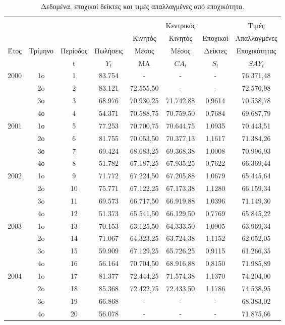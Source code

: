 \begin{table} [h]
  \caption{Δεδομένα, εποχικοί δείκτες και τιμές απαλλαγμένες από εποχικότητα.} 
  \label{tab_1}
  \begin{center}
    \begin{tabular}{|c|c|c|c|c|c|c|c|}
      \hline
           &         &              &          &         
           &         &              &          \\
           &         &              &          &
           & Κεντρικός  &     & Τιμές \\
           &  &  &  & Κινητός & Κινητός  & Εποχικοί &Απαλλαγμένες
            \\
      Έτος & Τρίμηνο & Περίοδος  & Πωλήσεις  & Μέσος  & Μέσος  & Δείκτες  & Εποχικότητας  \\
   &   & t & $Y_t $ & MA & $ CA_t$ & $ S_t$ & $SAY_t $ \\
      \hline \hline
      2000 &  1o  &  1  &  83.754  &  -  &  -  &   -  &  76.371,48\\
           &  2o  &  2  &  83.121  &  72.555,50  &  -  &  -  &  72.576,98\\
           & 3ο & 3  &  68.976 & 70.930,25  & 71.742,88  & 0,9614 & 70.538,78 \\
           & 4ο & 4 & 54.371 & 70.588,75 & 70.759,50  & 0,7684 & 69.687,79 \\
           
        2001   & 1ο & 5  & 77.253  &70.700,75  &70.644,75  & 1,0935 &70.443,51\\
        & 2ο & 6 & 81.755 &70.053,50 &70.377,13  & 1,1617 &71.384,26\\
        & 3ο & 7  &69.424  & 68.683,25 & 69.368,38 & 1,0008 & 70.996,93\\
        & 4ο &8  & 51.782 & 67.187,25 &67.935,25 & 0,7622 & 66.369,44\\
     2002   & 1o & 9 & 71.772 & 67.224,50 & 67.205,88  & 1,0679 & 65.445,64 \\
     & 2o  & 10 & 75.771 & 67.122,25 & 67.173,38 & 1,1280 & 66.159,34\\
     & 3o & 11 & 69.573 & 66.717,50 & 66.919,88 & 1,0396 & 71.149,30\\
     & 4o & 12 & 51.373 & 65.541,50 &66.129,50 &0,7769  &65.845,22\\
   2003  & 1o & 13 &70.153  & 63.125,50 & 64.333,50 & 1,0905  &63.969,34\\
     & 2o & 14 &71.067 & 64.323,25 & 63.724,38 & 1,1152 & 62.052,05\\
     & 3o & 15 & 59.909  & 67.129,25 & 65.726,25  & 0,9115 &61.266,35\\
      & 4o & 16 & 56.164 & 70.704,50 & 68.916,88  & 0,8150 & 71.985,89\\
      2004& 1o &  17& 81.377 & 72.444,25 & 71.574,38 & 1,1370 &74.204,00\\
      & 2o & 18 & 85.368 & 72.422,75  & 72.433,50 & 1,1786 &74.538,95\\
      & 3o &19  & 66.868 & - & - & - &68.383,02\\
      & 4o & 20 & 56.078 & - & - & - &71.875,66\\
     

\end{tabular}
\end{center}
\end{table}
